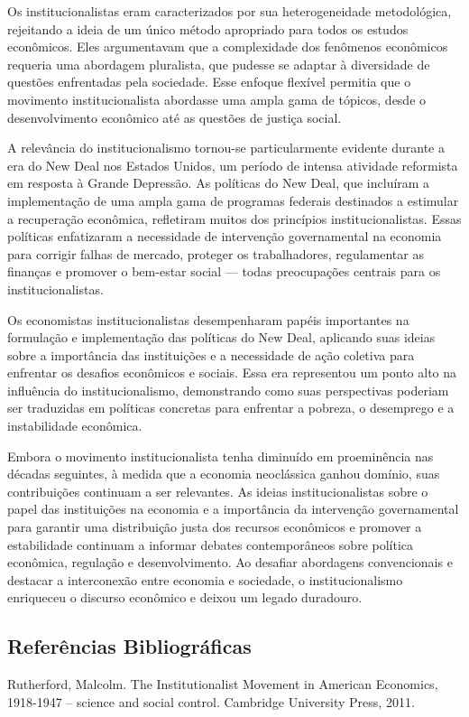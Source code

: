 \documentclass[12pt]{article}
\begin{document}
Os institucionalistas eram caracterizados por sua heterogeneidade metodológica, rejeitando a ideia de um único método apropriado para todos os estudos econômicos. Eles argumentavam que a complexidade dos fenômenos econômicos requeria uma abordagem pluralista, que pudesse se adaptar à diversidade de questões enfrentadas pela sociedade. Esse enfoque flexível permitia que o movimento institucionalista abordasse uma ampla gama de tópicos, desde o desenvolvimento econômico até as questões de justiça social.

A relevância do institucionalismo tornou-se particularmente evidente durante a era do New Deal nos Estados Unidos, um período de intensa atividade reformista em resposta à Grande Depressão. As políticas do New Deal, que incluíram a implementação de uma ampla gama de programas federais destinados a estimular a recuperação econômica, refletiram muitos dos princípios institucionalistas. Essas políticas enfatizaram a necessidade de intervenção governamental na economia para corrigir falhas de mercado, proteger os trabalhadores, regulamentar as finanças e promover o bem-estar social — todas preocupações centrais para os institucionalistas.

Os economistas institucionalistas desempenharam papéis importantes na formulação e implementação das políticas do New Deal, aplicando suas ideias sobre a importância das instituições e a necessidade de ação coletiva para enfrentar os desafios econômicos e sociais. Essa era representou um ponto alto na influência do institucionalismo, demonstrando como suas perspectivas poderiam ser traduzidas em políticas concretas para enfrentar a pobreza, o desemprego e a instabilidade econômica.

Embora o movimento institucionalista tenha diminuído em proeminência nas décadas seguintes, à medida que a economia neoclássica ganhou domínio, suas contribuições continuam a ser relevantes. As ideias institucionalistas sobre o papel das instituições na economia e a importância da intervenção governamental para garantir uma distribuição justa dos recursos econômicos e promover a estabilidade continuam a informar debates contemporâneos sobre política econômica, regulação e desenvolvimento. Ao desafiar abordagens convencionais e destacar a interconexão entre economia e sociedade, o institucionalismo enriqueceu o discurso econômico e deixou um legado duradouro.

\subsection{\textbf{Referências Bibliográficas}}
Rutherford, Malcolm. The Institutionalist Movement in American Economics, 1918-1947 –
science and social control. Cambridge University Press, 2011.
\end{document}

